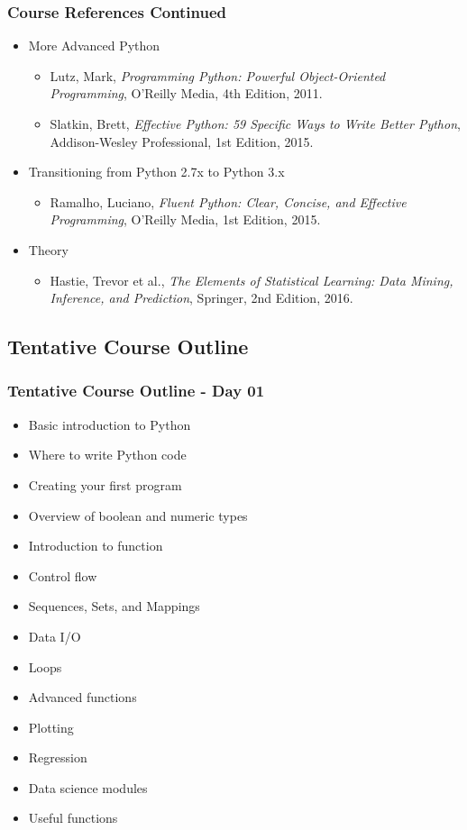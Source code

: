 \documentclass[mini frame in current subsection]{beamer}
\begin{document}
		\begin{frame}
			\frametitle{Course References Continued}
			\begin{itemize}
				\vfill\item More Advanced Python
					\begin{itemize}
						\item  Lutz, Mark, {\textit{Programming Python: Powerful Object-Oriented Programming}}, O'Reilly Media, 4th Edition, 2011.
						\item  Slatkin, Brett, {\textit{Effective Python: 59 Specific Ways to Write Better Python}}, Addison-Wesley Professional, 1st Edition, 2015.
					\end{itemize}
				\vfill\item  Transitioning from Python 2.7x to Python 3.x
					\begin{itemize}
						\item  Ramalho, Luciano, {\textit{Fluent Python: Clear, Concise, and Effective Programming}}, O'Reilly Media, 1st Edition, 2015.
					\end{itemize}
				\vfill\item  Theory
					\begin{itemize}
						\item  Hastie, Trevor et al., {\textit{The Elements of Statistical Learning: Data Mining, Inference, and Prediction}}, Springer, 2nd Edition, 2016.
				\end{itemize}
			\end{itemize}
		\end{frame}
		
	\subsection{Tentative Course Outline}
		\begin{frame}
			\frametitle{Tentative Course Outline - Day 01}
			\begin{itemize}
				\item  Basic introduction to Python
				\item  Where to write Python code
				\item  Creating your first program
				\item  Overview of boolean and numeric types
				\item  Introduction to function
				\item  Control flow
				\item  Sequences, Sets, and Mappings
				\item  Data I/O
				\item  Loops
				\item  Advanced functions
				\item  Plotting
				\item  Regression
				\item  Data science modules
				\item  Useful functions
			\end{itemize}
		\end{frame}
\end{document}
